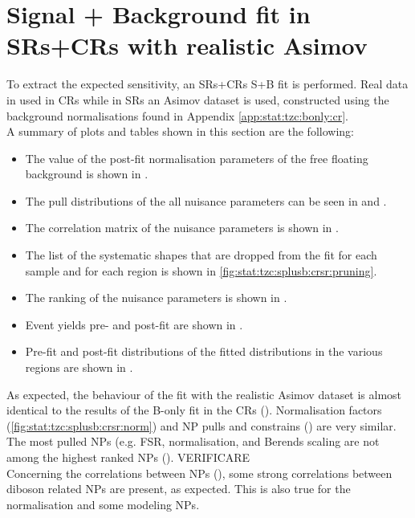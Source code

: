 \section{Signal + Background fit in SRs+CRs with realistic Asimov}
\label{sec:stat:tzc:splusb:crsr}
To extract the expected sensitivity, an SRs+CRs S+B fit is performed. 
Real data in used in CRs while in SRs an Asimov dataset is used,
constructed using the background normalisations found in Appendix \ref{app:stat:tzc:bonly:cr}.\\
A summary of plots and tables shown in this section are the following:
\begin{itemize}
\item The value of the post-fit normalisation parameters of the free floating background is shown in .\\
\item The pull distributions of the all nuisance parameters can be seen in  and . \\
\item The correlation matrix of the nuisance parameters is shown in . \\
\item The list of the systematic shapes that are dropped from the fit for each sample and for each region is shown in \cref{fig:stat:tzc:splusb:crsr:pruning}.\\
\item The ranking of the nuisance parameters is shown in . 
\item Event yields pre- and post-fit are shown in . \\
\item Pre-fit and post-fit distributions of the fitted distributions in the various regions are shown in .
\end{itemize}
As expected, the behaviour of the fit with the realistic Asimov dataset
is almost identical to the results of the B-only fit in the CRs
(). 
Normalisation factors (\cref{fig:stat:tzc:splusb:crsr:norm}) and NP
pulls and constrains 
() 
are very similar. 
The most pulled NPs (e.g. \ttbar FSR, \VVHF 
normalisation, and \VVHF Berends scaling are
not among the highest ranked NPs
(). VERIFICARE \\
Concerning the correlations between NPs
(), some strong correlations
between diboson related NPs are present, as expected. This is also
true for the \ttbar normalisation and some \ttbar modeling NPs. 

